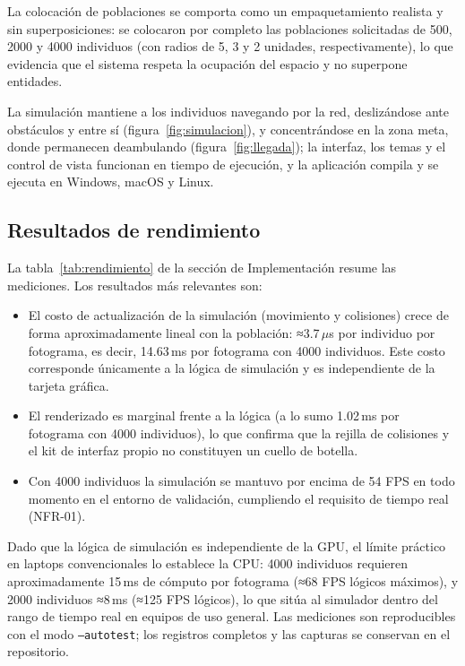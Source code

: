 \documentclass[12pt,a4paper]{article}
\begin{document}
La colocación de poblaciones se comporta como un empaquetamiento realista y sin superposiciones: se colocaron por completo las poblaciones solicitadas de 500, 2000 y 4000 individuos (con radios de 5, 3 y 2 unidades, respectivamente), lo que evidencia que el sistema respeta la ocupación del espacio y no superpone entidades.

La simulación mantiene a los individuos navegando por la red, deslizándose ante obstáculos y entre sí (figura~\ref{fig:simulacion}), y concentrándose en la zona meta, donde permanecen deambulando (figura~\ref{fig:llegada}); la interfaz, los temas y el control de vista funcionan en tiempo de ejecución, y la aplicación compila y se ejecuta en Windows, macOS y Linux.

\subsection{Resultados de rendimiento}

La tabla~\ref{tab:rendimiento} de la sección de Implementación resume las mediciones. Los resultados más relevantes son:

\begin{itemize}
    \item El costo de actualización de la simulación (movimiento y colisiones) crece de forma aproximadamente lineal con la población: ≈3.7\,$\mu$s por individuo por fotograma, es decir, 14.63\,ms por fotograma con 4000 individuos. Este costo corresponde únicamente a la lógica de simulación y es independiente de la tarjeta gráfica.
    \item El renderizado es marginal frente a la lógica (a lo sumo 1.02\,ms por fotograma con 4000 individuos), lo que confirma que la rejilla de colisiones y el kit de interfaz propio no constituyen un cuello de botella.
    \item Con 4000 individuos la simulación se mantuvo por encima de 54 FPS en todo momento en el entorno de validación, cumpliendo el requisito de tiempo real (NFR-01).
\end{itemize}

Dado que la lógica de simulación es independiente de la GPU, el límite práctico en laptops convencionales lo establece la CPU: 4000 individuos requieren aproximadamente 15\,ms de cómputo por fotograma (≈68 FPS lógicos máximos), y 2000 individuos ≈8\,ms (≈125 FPS lógicos), lo que sitúa al simulador dentro del rango de tiempo real en equipos de uso general. Las mediciones son reproducibles con el modo \texttt{--autotest}; los registros completos y las capturas se conservan en el repositorio.
\end{document}
